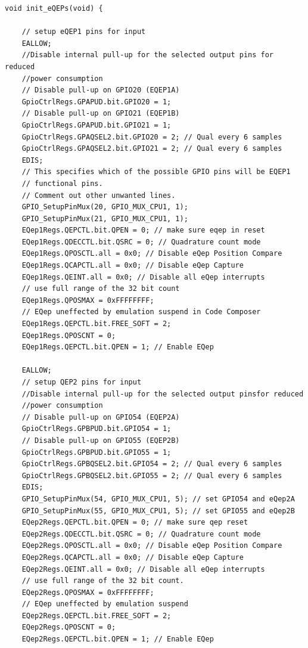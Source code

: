 \documentclass[11pt]{article}
\begin{document}
\begin{verbatim}
void init_eQEPs(void) {

    // setup eQEP1 pins for input
    EALLOW;
    //Disable internal pull-up for the selected output pins for reduced
    //power consumption
    // Disable pull-up on GPIO20 (EQEP1A)
    GpioCtrlRegs.GPAPUD.bit.GPIO20 = 1;
    // Disable pull-up on GPIO21 (EQEP1B)
    GpioCtrlRegs.GPAPUD.bit.GPIO21 = 1;
    GpioCtrlRegs.GPAQSEL2.bit.GPIO20 = 2; // Qual every 6 samples
    GpioCtrlRegs.GPAQSEL2.bit.GPIO21 = 2; // Qual every 6 samples
    EDIS;
    // This specifies which of the possible GPIO pins will be EQEP1
    // functional pins.
    // Comment out other unwanted lines.
    GPIO_SetupPinMux(20, GPIO_MUX_CPU1, 1);
    GPIO_SetupPinMux(21, GPIO_MUX_CPU1, 1);
    EQep1Regs.QEPCTL.bit.QPEN = 0; // make sure eqep in reset
    EQep1Regs.QDECCTL.bit.QSRC = 0; // Quadrature count mode
    EQep1Regs.QPOSCTL.all = 0x0; // Disable eQep Position Compare
    EQep1Regs.QCAPCTL.all = 0x0; // Disable eQep Capture
    EQep1Regs.QEINT.all = 0x0; // Disable all eQep interrupts
    // use full range of the 32 bit count
    EQep1Regs.QPOSMAX = 0xFFFFFFFF;
    // EQep uneffected by emulation suspend in Code Composer
    EQep1Regs.QEPCTL.bit.FREE_SOFT = 2;
    EQep1Regs.QPOSCNT = 0;
    EQep1Regs.QEPCTL.bit.QPEN = 1; // Enable EQep

    EALLOW;
    // setup QEP2 pins for input
    //Disable internal pull-up for the selected output pinsfor reduced
    //power consumption
    // Disable pull-up on GPIO54 (EQEP2A)
    GpioCtrlRegs.GPBPUD.bit.GPIO54 = 1;
    // Disable pull-up on GPIO55 (EQEP2B)
    GpioCtrlRegs.GPBPUD.bit.GPIO55 = 1;
    GpioCtrlRegs.GPBQSEL2.bit.GPIO54 = 2; // Qual every 6 samples
    GpioCtrlRegs.GPBQSEL2.bit.GPIO55 = 2; // Qual every 6 samples
    EDIS;
    GPIO_SetupPinMux(54, GPIO_MUX_CPU1, 5); // set GPIO54 and eQep2A
    GPIO_SetupPinMux(55, GPIO_MUX_CPU1, 5); // set GPIO55 and eQep2B
    EQep2Regs.QEPCTL.bit.QPEN = 0; // make sure qep reset
    EQep2Regs.QDECCTL.bit.QSRC = 0; // Quadrature count mode
    EQep2Regs.QPOSCTL.all = 0x0; // Disable eQep Position Compare
    EQep2Regs.QCAPCTL.all = 0x0; // Disable eQep Capture
    EQep2Regs.QEINT.all = 0x0; // Disable all eQep interrupts
    // use full range of the 32 bit count.
    EQep2Regs.QPOSMAX = 0xFFFFFFFF;
    // EQep uneffected by emulation suspend
    EQep2Regs.QEPCTL.bit.FREE_SOFT = 2;
    EQep2Regs.QPOSCNT = 0;
    EQep2Regs.QEPCTL.bit.QPEN = 1; // Enable EQep


\end{verbatim}
\end{document}
